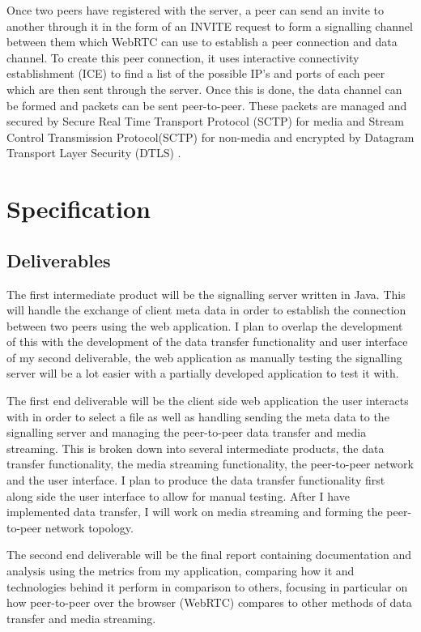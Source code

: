 \documentclass[]{report}
\begin{document}
			Once two peers have registered with the server, a peer can send an invite to another through it in the form of an INVITE request to form a signalling channel between them which WebRTC can use to establish a peer connection and data channel. To create this peer connection, it uses interactive connectivity establishment (ICE) to find a list of the possible IP's and ports of each peer which are then sent through the server. Once this is done, the data channel can be formed and packets can be sent peer-to-peer. These packets are managed and secured by Secure Real Time Transport Protocol (SCTP) for media and Stream Control Transmission Protocol(SCTP) for non-media and encrypted by Datagram Transport Layer Security (DTLS) \cite{WebRTC Data Channel Establishment Protocol}.
						
	\section{Specification}
			\subsection*{Deliverables}
			The first intermediate product will be the signalling server written in Java. This will handle the exchange of client meta data in order to establish the connection between two peers using the web application. I plan to overlap the development of this with the development of the data transfer functionality and user interface of my second deliverable, the web application as manually testing the signalling server will be a lot easier with a partially developed application to test it with.
			
			The first end deliverable will be the client side web application the user interacts with in order to select a file as well as handling sending the meta data to the signalling server and managing the peer-to-peer data transfer and media streaming. This is broken down into several intermediate products, the data transfer functionality, the media streaming functionality, the peer-to-peer network and the user interface. I plan to produce the data transfer functionality first along side the user interface to allow for manual testing. After I have implemented data transfer, I will work on media streaming and forming the peer-to-peer network topology. 
			
			The second end deliverable will be the final report containing documentation and analysis using the metrics from my application, comparing how it and technologies behind it perform in comparison to others, focusing in particular on how peer-to-peer over the browser (WebRTC) compares to other methods of data transfer and media streaming.
			
\end{document}
